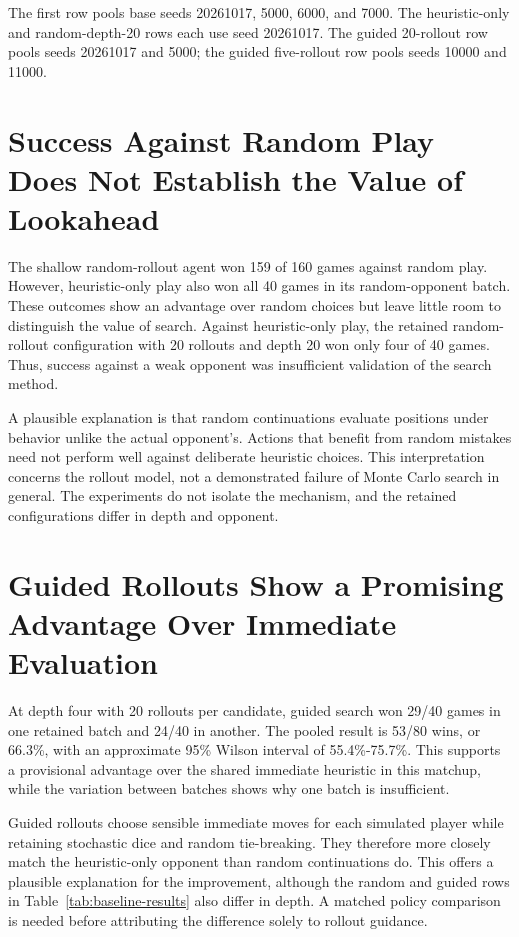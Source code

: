The first row pools base seeds 20261017, 5000, 6000, and 7000. The heuristic-only and random-depth-20 rows each use seed 20261017. The guided 20-rollout row pools seeds 20261017 and 5000; the guided five-rollout row pools seeds 10000 and 11000.

\section{Success Against Random Play Does Not Establish the Value of Lookahead}

The shallow random-rollout agent won 159 of 160 games against random play. However, heuristic-only play also won all 40 games in its random-opponent batch. These outcomes show an advantage over random choices but leave little room to distinguish the value of search. Against heuristic-only play, the retained random-rollout configuration with 20 rollouts and depth 20 won only four of 40 games. Thus, success against a weak opponent was insufficient validation of the search method.

A plausible explanation is that random continuations evaluate positions under behavior unlike the actual opponent's. Actions that benefit from random mistakes need not perform well against deliberate heuristic choices. This interpretation concerns the rollout model, not a demonstrated failure of Monte Carlo search in general. The experiments do not isolate the mechanism, and the retained configurations differ in depth and opponent.

\section{Guided Rollouts Show a Promising Advantage Over Immediate Evaluation}

At depth four with 20 rollouts per candidate, guided search won 29/40 games in one retained batch and 24/40 in another. The pooled result is 53/80 wins, or 66.3\%, with an approximate 95\% Wilson interval of 55.4\%-75.7\%. This supports a provisional advantage over the shared immediate heuristic in this matchup, while the variation between batches shows why one batch is insufficient.

Guided rollouts choose sensible immediate moves for each simulated player while retaining stochastic dice and random tie-breaking. They therefore more closely match the heuristic-only opponent than random continuations do. This offers a plausible explanation for the improvement, although the random and guided rows in Table~\ref{tab:baseline-results} also differ in depth. A matched policy comparison is needed before attributing the difference solely to rollout guidance.

